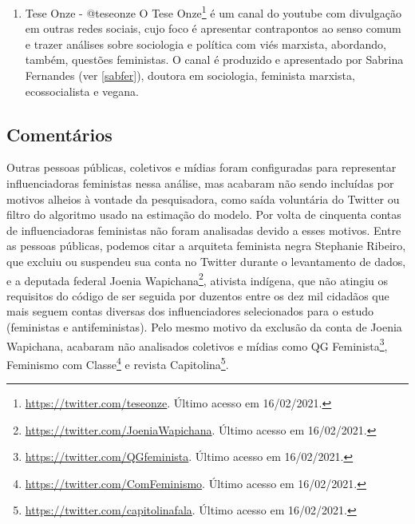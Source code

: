 \documentclass[
	12pt,				%
	openright,			%
	twoside,			%
	a4paper,			%
	english,			%
	brazil				%
	]{abntex2}
\begin{document}
\begin{anexosenv}
\begin{enumerate}
 Revista feminista independente, a Revista AzMina\footnote{\url{https://twitter.com/revistaazmina}. Último acesso em 16/02/2021.} foi criada em 2015 através de financiamento coletivo. Atualmente organizada dentro do Instituto AzMina, uma organização sem fins lucrativos, a revista digital expandiu-se para novos horizontes de luta pela igualdade de gênero, com um aplicativo de enfrentamento à violência doméstica, uma plataforma de monitoramento legislativo dos direitos das mulheres, além de palestras e consultorias.

 \item Tese Onze - @teseonze
 O Tese Onze\footnote{\url{https://twitter.com/teseonze}. Último acesso em 16/02/2021.} é um canal do youtube com divulgação em outras redes sociais, cujo foco é apresentar contrapontos ao senso comum e trazer análises sobre sociologia e política com viés marxista, abordando, também, questões feministas. O canal é produzido e apresentado por Sabrina Fernandes (ver \ref{sabfer}), doutora em sociologia, feminista marxista, ecossocialista e vegana.
 
 \end{enumerate}
 
 \subsection*{Comentários}
 Outras pessoas públicas, coletivos e mídias foram configuradas para representar influenciadoras feministas nessa análise, mas acabaram não sendo incluídas por motivos alheios à vontade da pesquisadora, como saída voluntária do Twitter ou filtro do algoritmo usado na estimação do modelo. Por volta de cinquenta contas de influenciadoras feministas não foram analisadas devido a esses motivos. Entre as pessoas públicas, podemos citar a arquiteta feminista negra Stephanie Ribeiro, que excluiu ou suspendeu sua conta no Twitter durante o levantamento de dados, e a deputada federal Joenia Wapichana\footnote{\url{https://twitter.com/JoeniaWapichana}. Último acesso em 16/02/2021.}, ativista indígena, que não atingiu os requisitos do código de ser seguida por duzentos entre os dez mil cidadãos que mais seguem contas diversas dos influenciadores selecionados para o estudo (feministas e antifeministas). Pelo mesmo motivo da exclusão da conta de Joenia Wapichana, acabaram não analisados coletivos e mídias como QG Feminista\footnote{\url{https://twitter.com/QGfeminista}. Último acesso em 16/02/2021.}, Feminismo com Classe\footnote{\url{https://twitter.com/ComFeminismo}. Último acesso em 16/02/2021.} e revista Capitolina\footnote{\url{https://twitter.com/capitolinafala}. Último acesso em 16/02/2021.}.
 

\end{anexosenv}
\end{document}
